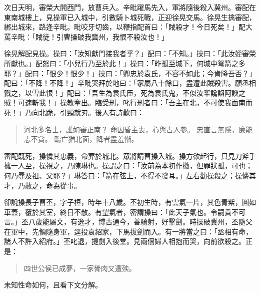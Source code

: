 次日天明，審榮大開西門，放曹兵入。辛毗躍馬先入，軍將隨後殺入冀州。審配在東南城樓上，見操軍已入城中，引數騎卜城死戰，正迎徐晃交馬。徐晃生擒審配，綁出城來，路逢辛毗。毗咬牙切齒，以鞭指配首曰：「賊殺才！今日死矣！」配大罵辛毗：「賊徒！引曹操破我冀州，我恨不殺汝也！」

徐晃解配見操。操曰：「汝知獻門接我者乎？」配曰：「不知。」操曰：「此汝姪審榮所獻也。」配怒曰：「小兒行乃至於此！」操曰：「昨孤至城下，何城中弩箭之多耶？」配曰：「恨少！恨少！」操曰：「卿忠於袁氏，不容不如此；今肯降吾否？」配曰：「不降！不降！」辛毗哭拜於地曰：「家屬八十餘口，盡遭此賊殺害。願丞相戮之，以雪此恨！」配曰：「吾生為袁氏臣，死為袁氏鬼，不似汝輩讒諂阿諛之賊！可速斬我！」操教牽出。臨受刑，叱行刑者曰：「吾主在北，不可使我面南而死！」乃向北跪，引頸就刃。後人有詩歎曰：

\begin{quote}
河北多名士，誰如審正南？
命因昏主喪，心與古人參。
忠直言無隱，廉能志不貪。
臨亡猶北面，降者盡羞慚。
\end{quote}

審配既死，操憐其忠義，命葬於城北。眾將請曹操入城。操方欲起行，只見刀斧手擁一人至，操視之，乃陳琳也。操謂之曰：「汝前為本初作檄，但罪狀孤，可也；何乃辱及祖、父耶？」琳答曰：「箭在弦上，不得不發耳。」左右勸操殺之；操憐其才，乃赦之，命為從事。

卻說操長子曹丕，字子桓，時年十八歲。丕初生時，有雲氣一片，其色青紫，圓如車蓋，覆於其室，終日不散。有望氣者，密謂操曰：「此天子氣也。令嗣貴不可言。」丕八歲能屬文，有逸才，博古通今，善騎射，好擊劍。時操破冀州，丕隨父在軍中，先領隨身軍，逕投袁紹家，下馬拔劍而入。有一將當之曰：「丞相有命，諸人不許入紹府。」丕叱退，提劍入後堂。見兩個婦人相抱而哭，向前欲殺之。正是：

\begin{quote}
四世公侯已成夢，一家骨肉又遭殃。
\end{quote}

未知性命如何，且看下文分解。
